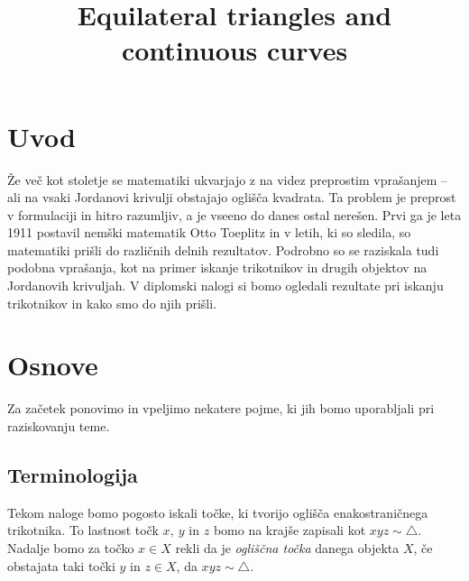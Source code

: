 \documentclass[mat1]{fmfdelo}
\title{Equilateral triangles and continuous curves}
\begin{document}
\section{Uvod}
Že več kot stoletje se matematiki ukvarjajo z na videz preprostim vprašanjem -- ali na vsaki Jordanovi krivulji obstajajo oglišča kvadrata. Ta problem je preprost v formulaciji in hitro razumljiv, a je vseeno do danes ostal nerešen. Prvi ga je leta 1911 postavil nemški matematik Otto Toeplitz \cite{splet_idaho} in v letih, ki so sledila, so matematiki prišli do različnih delnih rezultatov. Podrobno so se raziskala tudi podobna vprašanja, kot na primer iskanje trikotnikov in drugih objektov na Jordanovih krivuljah. V diplomski nalogi si bomo ogledali rezultate pri iskanju trikotnikov in kako smo do njih prišli.

\section{Osnove}

Za začetek ponovimo in vpeljimo nekatere pojme, ki jih bomo uporabljali pri raziskovanju teme.

\subsection{Terminologija}

Tekom naloge bomo pogosto iskali točke, ki tvorijo oglišča enakostraničnega trikotnika. To lastnost točk $x,\ y$ in $z$ bomo na krajše zapisali kot $xyz \sim \triangle$. Nadalje bomo za točko $x \in X$ rekli da je \emph{ogliščna točka} danega objekta $X$, če obstajata taki točki $y$ in $z \in X$, da $xyz \sim \triangle$.
\end{document}
